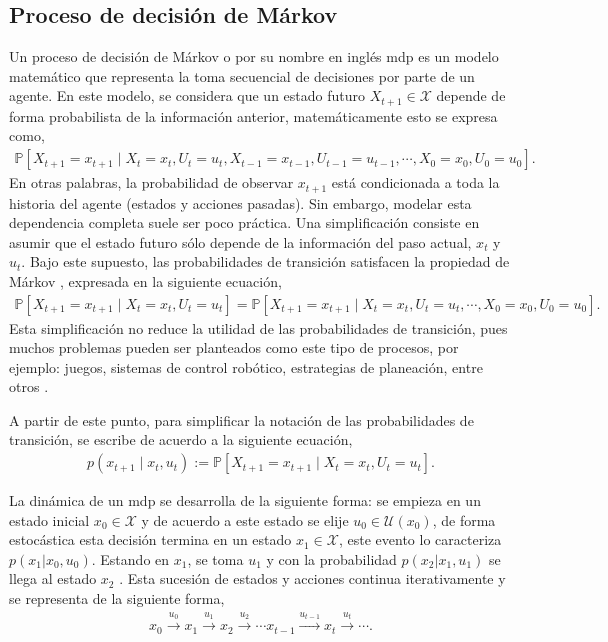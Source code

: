 \subsection{Proceso de decisión de Márkov}\label{MPD}
Un proceso de decisión de Márkov o por su nombre en inglés \acrfull{mdp} es un modelo matemático que representa la toma secuencial de decisiones por parte de un agente. En este modelo, se considera que un estado futuro $X_{t+1} \in \mathcal{X}$ depende de forma probabilista de la información anterior, matemáticamente esto se expresa como,
\begin{align}
\mathbb{P}[X_{t+1}=x_{t+1} \mid X_t=x_t, U_t=u_t, X_{t-1}=x_{t-1}, U_{t-1}=u_{t-1}, \cdots, X_0=x_0, U_0=u_0].
\end{align}
En otras palabras, la probabilidad de observar $x_{t+1}$ está condicionada a toda la historia del agente (estados y acciones pasadas). Sin embargo, modelar esta dependencia completa suele ser poco práctica. Una simplificación consiste en asumir que el estado futuro sólo depende de la información del paso actual, $x_t$ y $u_t$. Bajo este supuesto, las probabilidades de transición satisfacen la propiedad de Márkov \cite{Sutton2018}, expresada en la siguiente ecuación,
\begin{align}
    \mathbb{P}[X_{t+1}=x_{t+1} \mid X_t=x_t, U_t=u_t] = \mathbb{P}[X_{t+1}=x_{t+1} \mid X_t=x_t, U_t=u_t, \cdots, X_0=x_0, U_0=u_0].
\end{align}
Esta simplificación no reduce la utilidad de las probabilidades de transición, pues muchos problemas pueden ser planteados como este tipo de procesos, por ejemplo: juegos, sistemas de control robótico, estrategias de planeación, entre otros \cite{laura2020}.

A partir de este punto, para simplificar la notación de las probabilidades de transición, se escribe de acuerdo a la siguiente ecuación, 
\begin{align}
    p(x_{t+1}\mid x_t,u_t) := \mathbb{P}[X_{t+1}=x_{t+1} \mid X_t=x_t, U_t=u_t].
\end{align}

La dinámica de un \acrshort{mdp} se desarrolla de la siguiente forma: se empieza en un estado inicial $x_0 \in \mathcal{X}$ y de acuerdo a este estado se elije $u_0 \in \mathcal{U}(x_0)$, de forma estocástica esta decisión termina en un estado $x_1 \in \mathcal{X}$, este evento lo caracteriza $p(x_1|x_0, u_0)$. Estando en $x_1$, se toma $u_1$ y con la probabilidad $p(x_2|x_1, u_1)$ se llega al estado $x_2$ \cite{Han2018AMI}. Esta sucesión de estados y acciones continua iterativamente y se representa de la siguiente forma, 
\begin{align}
    x_0 \xrightarrow{u_0} x_1 \xrightarrow{u_1} x_2 \xrightarrow{u_2} \cdots x_{t-1} \xrightarrow{u_{t-1}} x_{t} \xrightarrow{u_t} \cdots.
\end{align}


